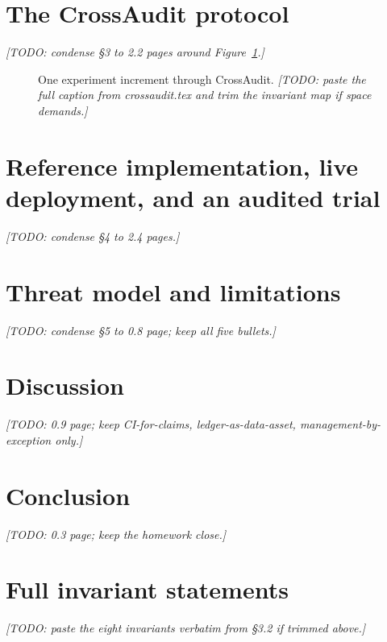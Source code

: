 \documentclass[10pt]{article}
\begin{document}
\section{The CrossAudit protocol}\label{sec:protocol}
\emph{[TODO: condense \S3 to 2.2 pages around Figure~\ref{fig:arch}.]}

\begin{figure}[t]
\centering
\resizebox{\textwidth}{!}{}
\caption{One experiment increment through CrossAudit. \emph{[TODO: paste the
full caption from crossaudit.tex and trim the invariant map if space demands.]}}
\label{fig:arch}
\end{figure}

\section{Reference implementation, live deployment, and an audited trial}\label{sec:implementation}
\emph{[TODO: condense \S4 to 2.4 pages.]}

\section{Threat model and limitations}\label{sec:threat}
\emph{[TODO: condense \S5 to 0.8 page; keep all five bullets.]}

\section{Discussion}\label{sec:discussion}
\emph{[TODO: 0.9 page; keep CI-for-claims, ledger-as-data-asset,
management-by-exception only.]}

\section{Conclusion}\label{sec:conclusion}
\emph{[TODO: 0.3 page; keep the homework close.]}



\appendix
\section{Full invariant statements}
\emph{[TODO: paste the eight invariants verbatim from \S3.2 if trimmed above.]}
\end{document}
